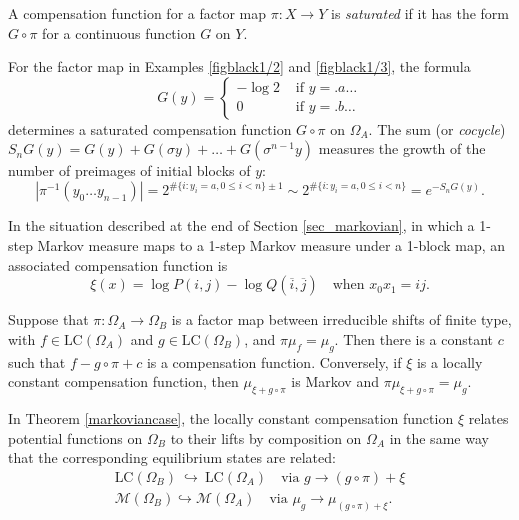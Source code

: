 \documentclass{kepart2010}
\theoremstyle{plain}
\theoremstyle{definition}
\theoremstyle{remark}
\theoremstyle{definition}
\numberwithin{equation}{section}
\begin{document}
A compensation function for a factor map $\pi : X \to Y$ is {\it
saturated} if it has the form $G\circ \pi$ for a continuous function
$G$ on $Y$.

\begin{ex}\label{ex_compfn1}
For the factor map in Examples \ref{figblack1/2} and
\ref{figblack1/3}, the formula
 \begin{equation}
 G(y)=\begin{cases}
-\log 2 &\text{ if } y=.a\dots\\
0 &\text{ if } y=.b\dots
\end{cases}
\end{equation} determines a saturated compensation function $G \circ \pi$ on
 $\Omega_A$.
 The  sum (or {\em cocycle}) $S_nG(y)=G(y)+G(\sigma y) + \dots +
G(\sigma^{n-1}y)$ measures the growth  of the number of preimages
of initial blocks of $y$: \begin{equation} |\pi^{-1}(y_0\dots y_{n-1})| =
2^{\text{\#}\{i: y_i=a,0\leq i < n\} \pm 1 } \sim 2^{\text{\#}\{i:
y_i=a,0\leq i < n\} } = e^{-S_nG(y)}. \end{equation}
\end{ex}

\begin{ex}\label{ex_compfn2}
In the situation described at the end of Section
\ref{sec_markovian}, in which a 1-step Markov measure maps to a
1-step
Markov measure under a 1-block map, an associated compensation
function is \begin{equation} \xi(x)= \log P(i,j) -\log Q(\overline i, \overline
j) \quad\text{when } x_0x_1=ij . \end{equation}
\end{ex}

\begin{thm}\cite{BoyleTuncel1984,Walters1986}\label{markoviancase}
Suppose that $\pi : \Omega_A \to \Omega_B$ is a factor map between
irreducible shifts of finite type, with $f\in \text{LC}(\Omega_A)$
and
$g\in \text{LC}(\Omega_B)$, and $\pi \mu_f = \mu_g$. Then
there is a constant $c$ such that
$f-g\circ \pi +c$ is a compensation function. Conversely, if
$\xi$ is a
locally constant compensation function, then
$\mu_{\xi+g\circ \pi} $ is Markov and
$\pi \mu_{\xi+g\circ \pi}  = \mu_g$.
\end{thm}

In Theorem \ref{markoviancase},
the locally constant compensation function $\xi$ relates potential
functions on $\Omega_B$ to their lifts by composition on $\Omega_A$
in the same way that the corresponding equilibrium states are
related: \begin{equation}
\begin{gathered}
 \text{LC}(\Omega_B)\ \hookrightarrow \
\text{LC}(\Omega_A) \quad\text{via } g\to (g\circ \pi)+\xi\\
{{\mathcal M}}(\Omega_B) \hookrightarrow {{\mathcal M}}(\Omega_A) \quad\text{via } \mu_g
\to \mu_{(g\circ \pi)+\xi} .
\end{gathered}
\end{equation}
\end{document}
